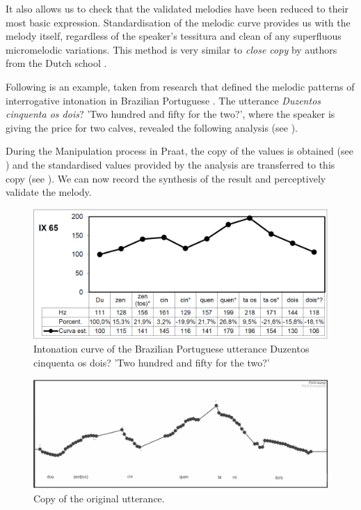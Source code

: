 \documentclass[output=paper]{langscibook}
\begin{document}
It also allows us to check that the validated melodies have been reduced to their most basic expression. Standardisation of the melodic curve provides us with the melody itself, regardless of the speaker’s tessitura and clean of any superfluous micromelodic variations. This method is very similar to \textit{close copy} by authors from the Dutch school \citep{Hart.1990}.

Following is an example, taken from research that defined the melodic patterns of interrogative intonation in Brazilian Portuguese \citep{CanteroSerena.2013}. The utterance \textit{Duzentos cinquenta os dois}? 'Two hundred and fifty for the two?', where the speaker is giving the price for two calves, revealed the following analysis (see ). 

During the Manipulation process in Praat, the copy of the values is obtained (see ) and the standardised values provided by the analysis are transferred to this copy (see ).
We can now record the synthesis of the result and perceptively validate the melody.


\begin{figure}
\caption{Intonation curve of the Brazilian Portuguese utterance Duzentos cinquenta os dois?   'Two hundred and fifty for the two?'}
\label{graph:font:4}
\includegraphics[width=\textwidth]{figures/FON-img9.PNG}
\end{figure}


\begin{figure}
\includegraphics[width=\textwidth]{figures/FON-img10.PNG}
\caption{Copy of the original utterance.}
\label{graph:font:5}
\end{figure}
\end{document}

